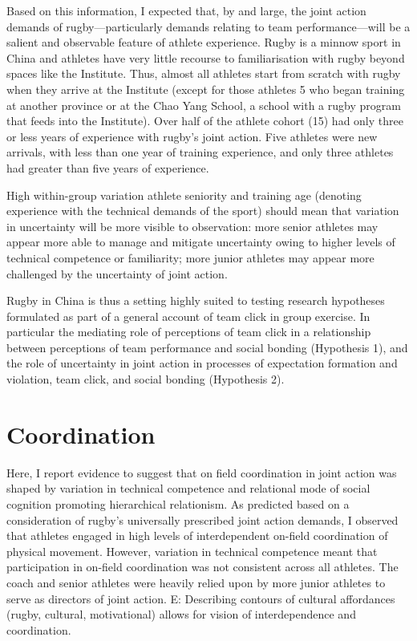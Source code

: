 \begin{CJK}{UTF8}{gbsn}
Based on this information, I expected that, by and large, the joint action demands of rugby---particularly demands relating to team performance---will be a salient and observable feature of athlete experience.  Rugby is a minnow sport in China and athletes have very little recourse to familiarisation with rugby beyond spaces like the Institute. Thus, almost all athletes start from scratch with rugby when they arrive at the Institute (except for those athletes 5 who began training at another province or at the Chao Yang School, a school with a rugby program that feeds into the Institute).  Over half of the athlete cohort (15) had only three or less years of experience with rugby's joint action.  Five athletes were new arrivals, with less than one year of training experience, and only three athletes had greater than five years of experience.

High within-group variation athlete seniority and training age (denoting experience with the technical demands of the sport) should mean that variation in uncertainty will be more visible to observation: more senior athletes may appear more able to manage and mitigate uncertainty owing to higher levels of technical competence or familiarity; more junior athletes may appear more challenged by the uncertainty of joint action.

Rugby in China is thus a setting highly suited to testing research hypotheses formulated as part of a general account of team click in group exercise. In particular the mediating role of perceptions of team click in a relationship between perceptions of team performance and social bonding (Hypothesis 1), and the role of uncertainty in joint action in processes of expectation formation and violation, team click, and social bonding (Hypothesis 2).



\section{Coordination}



Here, I report evidence to suggest that on field coordination in joint action was shaped by variation in technical competence and relational mode of social cognition promoting hierarchical relationism.  As predicted based on a consideration of rugby’s universally prescribed joint action demands, I observed that athletes engaged in high levels of interdependent on-field coordination of physical movement.  However, variation in technical competence meant that participation in on-field coordination was not consistent across all athletes.  The coach and senior athletes were heavily relied upon by more junior athletes to serve as directors of joint action.
E: Describing contours of cultural affordances (rugby, cultural, motivational) allows for vision of interdependence and coordination.


\end{CJK}
